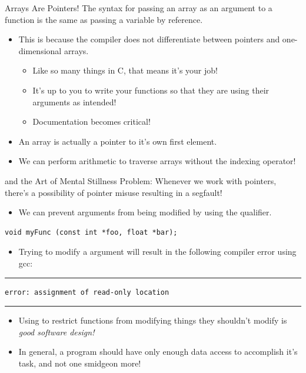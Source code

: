 \documentclass[11pt]{beamer}
\let\OldTexttt\texttt
\renewcommand{\texttt}[1]{\OldTexttt{\color{teal}{#1}}}
\begin{document}
\begin{frame}{Arrays Are Pointers!}
The syntax for passing an array as an argument to a function is the same as passing a variable by reference.  
\begin{itemize}
\item This is because the compiler does not differentiate between pointers and one-dimensional arrays.  
\begin{itemize}
\item Like so many things in C, that means it's your job! 
\item It's up to you to write your functions so that they are using their arguments as intended!  
\item Documentation becomes critical!
\end{itemize}
\item An array is actually a pointer to it's own first element.
\item We can perform arithmetic to traverse arrays without the indexing operator! 
\end{itemize}
\end{frame}

\begin{frame}[fragile=singleslide]{\texttt{const} and the Art of Mental Stillness}
Problem: Whenever we work with pointers, there's a possibility of pointer misuse resulting in a segfault! 
\begin{itemize}
\item We can prevent arguments from being modified by using the \texttt{const} qualifier.
\end{itemize}
\begin{lstlisting}[style=C]
void myFunc (const int *foo, float *bar);
\end{lstlisting}
\begin{itemize}
\item Trying to modify a \texttt{const} argument will result in the following compiler error using gcc:
\end{itemize}
\hrule
\begin{verbatim}
error: assignment of read-only location 
\end{verbatim}
\hrule
\begin{itemize}
\item Using \texttt{const} to restrict functions from modifying things they shouldn't modify is \emph{good software design!}
\item In general, a program should have only enough data access to accomplish it's task, and not one smidgeon more! 
\end{itemize}
\end{frame}
\end{document}
